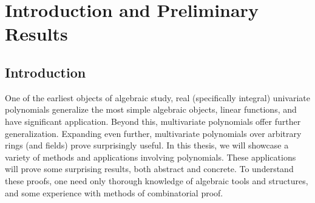 \chapter{Introduction and Preliminary Results}\label{chap:intro}
\setcounter{section}{0}
\setcounter{subsection}{0}
\setcounter{page}{1}

\section{Introduction}

One of the earliest objects of algebraic study, real (specifically integral) univariate polynomials generalize the most simple algebraic objects, linear functions, and have significant application. Beyond this, multivariate polynomials offer further generalization. Expanding even further, multivariate polynomials over arbitrary rings (and fields) prove surprisingly useful. In this thesis, we will showcase a variety of methods and applications involving polynomials. These applications will prove some surprising results, both abstract and concrete. To understand these proofs, one need only thorough knowledge of algebraic tools and structures, and some experience with methods of combinatorial proof.

